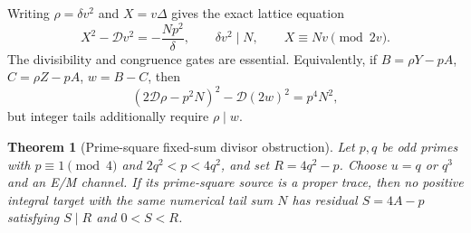 \documentclass[10pt,reqno]{amsart}
\newtheorem{theorem}{Theorem}\newtheorem{lemma}[theorem]{Lemma}
\begin{document}
Writing $\rho=\delta v^2$ and $X=v\Delta$ gives the exact lattice equation
\[
 X^2-\mathcal Dv^2=-\frac{Np^2}{\delta},\qquad
 \delta v^2\mid N,\qquad X\equiv Nv\pmod{2v}.
\]
The divisibility and congruence gates are essential.  Equivalently, if
$B=\rho Y-pA$, $C=\rho Z-pA$, $w=B-C$, then
\[
 (2\mathcal D\rho-p^2N)^2-\mathcal D(2w)^2=p^4N^2,
\]
but integer tails additionally require $\rho\mid w$.

\begin{theorem}[Prime-square fixed-sum divisor obstruction]
Let $p,q$ be odd primes with $p\equiv1\pmod4$ and
$2q^2<p<4q^2$, and set $R=4q^2-p$.  Choose $u=q$ or $q^3$ and
an E/M channel.  If its prime-square source is a proper trace, then no
positive integral target with the same numerical tail sum $N$ has residual
$S=4A-p$ satisfying $S\mid R$ and $0<S<R$.
\end{theorem}
\end{document}
